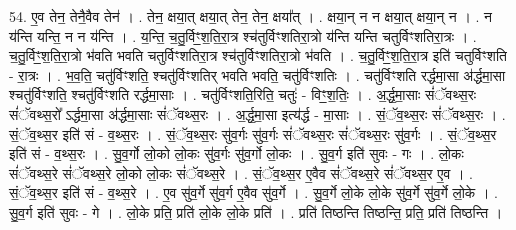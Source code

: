 \documentclass[17pt]{extarticle}
\begin{document}
54. ए॒व तेन॒ तेनै॒वैव तेन॑ । . तेन॒ क्षया॒त् क्षया॒त् तेन॒ तेन॒ क्षया᳚त् । . क्षया॒न् न न क्षया॒त् क्षया॒न् न । . न य॑न्ति यन्ति॒ न न य॑न्ति । . य॒न्ति॒ च॒तु॒र्विꣳ॒॒श॒ति॒रा॒त्र श्च॑तुर्विꣳशतिरा॒त्रो य॑न्ति यन्ति चतुर्विꣳशतिरा॒त्रः । . च॒तु॒र्विꣳ॒॒श॒ति॒रा॒त्रो भ॑वति भवति चतुर्विꣳशतिरा॒त्र श्च॑तुर्विꣳशतिरा॒त्रो भ॑वति । . च॒तु॒र्विꣳ॒॒श॒ति॒रा॒त्र इति॑ चतुर्विꣳशति - रा॒त्रः । . भ॒व॒ति॒ चतु॑र्विꣳशति॒ श्चतु॑र्विꣳशतिर् भवति भवति॒ चतु॑र्विꣳशतिः । . चतु॑र्विꣳशति रर्द्धमा॒सा अ॑र्द्धमा॒सा श्चतु॑र्विꣳशति॒ श्चतु॑र्विꣳशति रर्द्धमा॒साः । . चतु॑र्विꣳशति॒रिति॒ चतुः॑ - विꣳ॒॒श॒तिः॒ । . अ॒र्द्ध॒मा॒साः सं॑ॅवथ्स॒रः सं॑ॅवथ्स॒रो᳚ ऽर्द्धमा॒सा अ॑र्द्धमा॒साः सं॑ॅवथ्स॒रः । . अ॒र्द्ध॒मा॒सा इत्य॑र्द्ध - मा॒साः । . सं॒ॅव॒थ्स॒रः सं॑ॅवथ्स॒रः । . सं॒ॅव॒थ्स॒र इति॑ सं - व॒थ्स॒रः । . सं॒ॅव॒थ्स॒रः सु॑व॒र्गः सु॑व॒र्गः सं॑ॅवथ्स॒रः सं॑ॅवथ्स॒रः सु॑व॒र्गः । . सं॒ॅव॒थ्स॒र इति॑ सं - व॒थ्स॒रः । . सु॒व॒र्गो लो॒को लो॒कः सु॑व॒र्गः सु॑व॒र्गो लो॒कः । . सु॒व॒र्ग इति॑ सुवः - गः । . लो॒कः सं॑ॅवथ्स॒रे सं॑ॅवथ्स॒रे लो॒को लो॒कः सं॑ॅवथ्स॒रे । . सं॒ॅव॒थ्स॒र ए॒वैव सं॑ॅवथ्स॒रे सं॑ॅवथ्स॒र ए॒व । . सं॒ॅव॒थ्स॒र इति॑ सं - व॒थ्स॒रे । . ए॒व सु॑व॒र्गे सु॑व॒र्ग ए॒वैव सु॑व॒र्गे । . सु॒व॒र्गे लो॒के लो॒के सु॑व॒र्गे सु॑व॒र्गे लो॒के । . सु॒व॒र्ग इति॑ सुवः - गे । . लो॒के प्रति॒ प्रति॑ लो॒के लो॒के प्रति॑ । . प्रति॑ तिष्ठन्ति तिष्ठन्ति॒ प्रति॒ प्रति॑ तिष्ठन्ति । \newline
\end{document}
